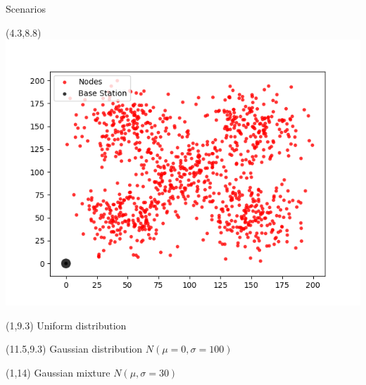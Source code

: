 \documentclass{beamer}
\begin{document}
\begin{frame}[t]{Scenarios}
\begin{textblock}{0.8}(4.3,8.8)
\includegraphics[scale=0.371]{figure/Scen3.png}
\end{textblock}

\begin{textblock}{7}(1,9.3)
\small
Uniform distribution
\end{textblock}

\begin{textblock}{3.5}(11.5,9.3)
\small
Gaussian distribution $N(\mu=0,\sigma=100)$
\end{textblock}

\begin{textblock}{3}(1,14)
\small
Gaussian mixture $N(\mu,\sigma=30)$
\end{textblock}

\end{frame}
\end{document}
